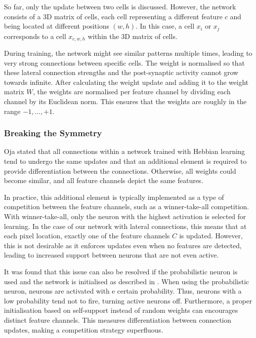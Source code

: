 So far, only the update between two cells is discussed. However, the network consists of a 3D matrix of cells, each cell representing a different feature $c$ and being located at different positions $(w,h)$. In this case, a cell $x_i$ or $x_j$ corresponds to a cell $x_{c,w,h}$ within the 3D matrix of cells.

During training, the network might see similar patterns multiple times, leading to very strong connections between specific cells. The weight is normalised so that these lateral connection strengths and the post-synaptic activity cannot grow towards infinite. After calculating the weight update and adding it to the weight matrix $W$, the weights are normalised per feature channel by dividing each channel by its Euclidean norm. This ensures that the weights are roughly in the range $-1, ..., +1$.


\subsubsection{Breaking the Symmetry} 
Oja \cite{oja_simplified_1982} stated that all connections within a network trained with Hebbian learning tend to undergo the same updates and that an additional element is required to provide differentiation between the connections. Otherwise, all weights could become similar, and all feature channels depict the same features.

In practice, this additional element is typically implemented as a type of competition between the feature channels, such as a winner-take-all competition. With winner-take-all, only the neuron with the highest activation is selected for learning. In the case of our network with lateral connections, this means that at each pixel location, exactly one of the feature channels $C$ is updated. However, this is not desirable as it enforces updates even when no features are detected, leading to increased support between neurons that are not even active.

It was found that this issue can also be resolved if the probabilistic neuron is used and the network is initialised as described in . When using the probabilistic neuron, neurons are activated with e certain probability. Thus, neurons with a low probability tend not to fire, turning active neurons off. 
Furthermore, a proper initialisation based on self-support instead of random weights can encourages distinct feature channels.
This measures differentiation between connection updates, making a competition strategy superfluous.


